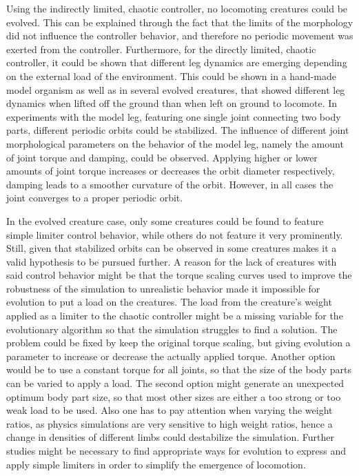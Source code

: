 \documentclass[main]{subfiles}
\begin{document}
%
Using the indirectly limited, chaotic controller, no locomoting creatures could be evolved. %
%
This can be explained through the fact that the limits of the morphology did not influence the controller behavior, and therefore no periodic movement was exerted from the controller. %
%
Furthermore, for the directly limited, chaotic controller, it could be shown that different leg dynamics are emerging depending on the external load of the environment. %
%
This could be shown in a hand-made model organism as well as in several evolved creatures, that showed different leg dynamics when lifted off the ground than when left on ground to locomote. %
%
In experiments with the model leg, featuring one single joint connecting two body parts, different periodic orbits could be stabilized. 
%
The influence of different joint morphological parameters on the behavior of the model leg, namely the amount of joint torque and damping, could be observed. %
%
Applying higher or lower amounts of joint torque increases or decreases the orbit diameter respectively, damping leads to a smoother curvature of the orbit. %
%
However, in all cases the joint converges to a proper periodic orbit.

In the evolved creature case, only some creatures could be found to feature simple limiter control behavior, while others do not feature it very prominently. %
%
Still, given that stabilized orbits can be observed in some creatures makes it a valid hypothesis to be pursued further.
%
A reason for the lack of creatures with said control behavior might be that the torque scaling curves used to improve the robustness of the simulation to unrealistic behavior made it impossible for evolution to put a load on the creatures. %
%
The load from the creature's weight applied as a limiter to the chaotic controller might be a missing variable for the evolutionary algorithm so that the simulation struggles to find a solution. %
%
The problem could be fixed by keep the original torque scaling, but giving evolution a parameter to increase or decrease the actually applied torque. %
%
Another option would be to use a constant torque for all joints, so that the size of the body parts can be varied to apply a load. %
%
The second option might generate an unexpected optimum body part size, so that most other sizes are either a too strong or too weak load to be used. %
%
Also one has to pay attention when varying the weight ratios, as physics simulations are very sensitive to high weight ratios, hence a change in densities of different limbs could destabilize the simulation. %
%
Further studies might be necessary to find appropriate ways for evolution to express and apply simple limiters in order to simplify the emergence of locomotion.%
\end{document}
